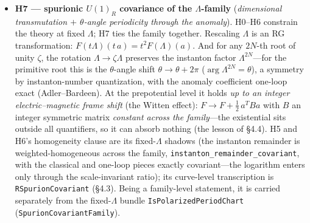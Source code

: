 \documentclass{article}
\theoremstyle{plain}
\theoremstyle{definition}
\numberwithin{equation}{section}
\newcommand{\code}[1]{\texttt{#1}}
\begin{document}
\begin{itemize}
{freedom}). The prepotential is \textbf{one-loop exact} in perturbation theory; the remainder is a
sum of instanton corrections weighted by the dynamical scale $\Lambda^{2N}$, with coefficients of
the prescribed scaling weight $2 - 2Nk$ --- the fixed-$\Lambda$ expression of their
$\Lambda$-\emph{independence}, without which the clause is vacuous (\S4.4)
(\code{PeriodChart.HasPrescribedAsymptotics}).
\item \textbf{H7 --- spurionic $U(1)_R$ covariance of the $\Lambda$-family}
(\emph{dimensional transmutation $+$ $\theta$-angle periodicity through the anomaly}).
H0--H6 constrain the theory at fixed $\Lambda$; H7 ties the family together. Rescaling
$\Lambda$ is an RG transformation: $F(t\Lambda)(t\,a) = t^2 F(\Lambda)(a)$. And for any
$2N$-th root of unity $\zeta$, the rotation $\Lambda \to \zeta\Lambda$ preserves the
instanton factor $\Lambda^{2N}$---for the primitive root this is the $\theta$-angle shift
$\theta \to \theta + 2\pi$ ($\arg\Lambda^{2N} = \theta$), a symmetry by
instanton-number quantization, with the anomaly coefficient one-loop exact
(Adler--Bardeen). At the prepotential level it holds \emph{up to an integer
electric--magnetic frame shift} (the Witten effect): $F \to F + \tfrac12\,a^{T}Ba$ with
$B$ an integer symmetric matrix \emph{constant across the family}---the existential sits
outside all quantifiers, so it can absorb nothing (the lesson of \S4.4). H5 and H6's
homogeneity clause are its fixed-$\Lambda$ shadows (the instanton remainder is
weighted-homogeneous across the family, \code{instanton\_remainder\_covariant}, with the
classical and one-loop pieces exactly covariant---the logarithm enters only through the
scale-invariant ratio); its curve-level transcription is \code{RSpurionCovariant}
(\S4.3). Being a family-level statement, it is carried separately from the fixed-$\Lambda$
bundle \code{IsPolarizedPeriodChart} (\code{SpurionCovariantFamily}).
\end{itemize}
\end{document}
